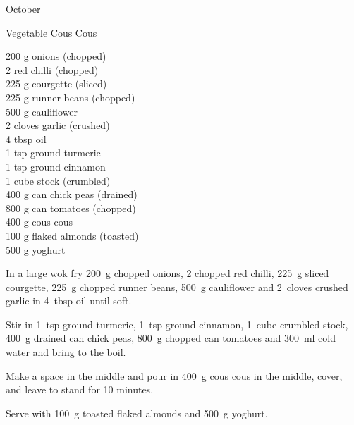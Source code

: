 \begin{menu}{October}
    \begin{recipe}{2}{Vegetable Cous Cous}%
		\begin{ingredients}
		200 g onions (chopped) \\
	2  red chilli (chopped) \\
	225 g courgette (sliced) \\
	225 g runner beans (chopped) \\
	500 g cauliflower  \\
	2 cloves garlic (crushed) \\
	4 tbsp oil  \\
	1 tsp ground turmeric  \\
	1 tsp ground cinnamon  \\
	1 cube stock (crumbled) \\
	400 g can chick peas (drained) \\
	800 g can tomatoes (chopped) \\
	400 g cous cous  \\
	100 g flaked almonds (toasted) \\
	500 g yoghurt  \\
	
		\end{ingredients}
	
	
    \begin{instructions}
    \item 
        In a large wok fry
        200~g chopped onions,
        2 chopped red chilli,
        225~g sliced courgette,
        225~g chopped runner beans,
        500~g  cauliflower
        and
        2~cloves crushed garlic
        in
        4~tbsp  oil
        until soft.
      \item 
        Stir in
        1~tsp  ground turmeric,
        1~tsp  ground cinnamon,
        1~cube crumbled stock,
        400~g drained can chick peas,
        800~g chopped can tomatoes
        and
        300~ml  cold water
        and bring to the boil.
      \item 
        Make a space in the middle and pour in
        400~g  cous cous
        in the middle, cover,
        and leave to stand for 10 minutes.
      \item 
        Serve with
        100~g toasted flaked almonds
        and
        500~g  yoghurt.
      
    \end{instructions}
    \end{recipe}%
  

\end{menu}
